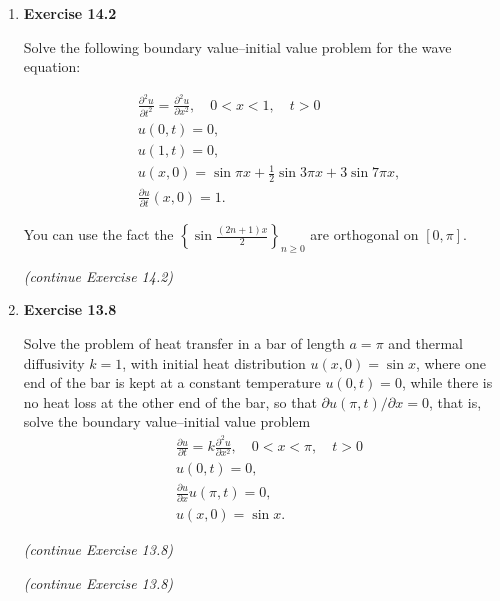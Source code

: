 \begin{enumerate}
\newpage

\item \textbf{Exercise 14.2}

Solve the following boundary value--initial value problem for the wave equation:

\[
\begin{aligned}
    & \frac{\partial ^{2}u}{\partial t^{2}} =  \frac{\partial^{2}u}{\partial x^{2}}, \quad 0<x<1, \quad t>0 \\
    & u(0,t)=0, \\
    & u(1,t)=0, \\
    & u(x,0)=\sin \pi x + \tfrac{1}{2}\sin 3\pi x + 3 \sin 7 \pi x, \\
    & \frac{\partial u}{\partial t}(x,0)= 1.
\end{aligned}
\]

You can use the fact the $\left\{ \sin\frac{(2n+1)x}{2} \right\}_{n\geq0}$ are orthogonal on $[0,\pi]$.

\newpage 

\textit{(continue Exercise 14.2)}


\newpage

\item \textbf{Exercise 13.8}

Solve the problem of heat transfer in a bar of length $a = \pi$ and thermal diffusivity $k = 1$, with initial heat distribution $u(x, 0) = \sin x$, where one end of the bar is kept at a constant temperature $u(0, t) = 0$, while there is no heat loss at the other end of the bar, so that $\partial u(\pi, t)/\partial x = 0$, that
is, solve the boundary value--initial value problem
\[
\begin{aligned}
    & \frac{\partial u}{\partial t} = k  \frac{\partial^{2}u}{\partial x^{2}}, \quad 0<x<\pi, \quad t>0 \\
    & u(0,t)=0, \\
    & \frac{\partial u}{\partial x}u(\pi,t)=0, \\
    & u(x,0)=\sin x.
\end{aligned}
\]

\newpage 

\textit{(continue Exercise 13.8)}

\newpage 

\textit{(continue Exercise 13.8)}

\end{enumerate}




